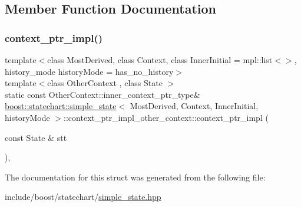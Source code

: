 \subsection{Member Function Documentation}
\mbox{\label{structboost_1_1statechart_1_1simple__state_1_1context__ptr__impl__other__context_a9fc63a5c8666fcb7e28b5f6cbfa62623}} 
\subsubsection{\texorpdfstring{context\+\_\+ptr\+\_\+impl()}{context\_ptr\_impl()}}
{\footnotesize\ttfamily template$<$class Most\+Derived, class Context, class Inner\+Initial = mpl\+::list$<$$>$, history\+\_\+mode history\+Mode = has\+\_\+no\+\_\+history$>$ \\
template$<$class Other\+Context , class State $>$ \\
static const Other\+Context\+::inner\+\_\+context\+\_\+ptr\+\_\+type\& \mbox{\hyperlink{classboost_1_1statechart_1_1simple__state}{boost\+::statechart\+::simple\+\_\+state}}$<$ Most\+Derived, Context, Inner\+Initial, history\+Mode $>$\+::context\+\_\+ptr\+\_\+impl\+\_\+other\+\_\+context\+::context\+\_\+ptr\+\_\+impl (\begin{DoxyParamCaption}\item[{const State \&}]{stt }\end{DoxyParamCaption})\hspace{0.3cm}{\ttfamily [inline]}, {\ttfamily [static]}}



The documentation for this struct was generated from the following file\+:\begin{DoxyCompactItemize}
\item 
include/boost/statechart/\mbox{\hyperlink{simple__state_8hpp}{simple\+\_\+state.\+hpp}}\end{DoxyCompactItemize}

